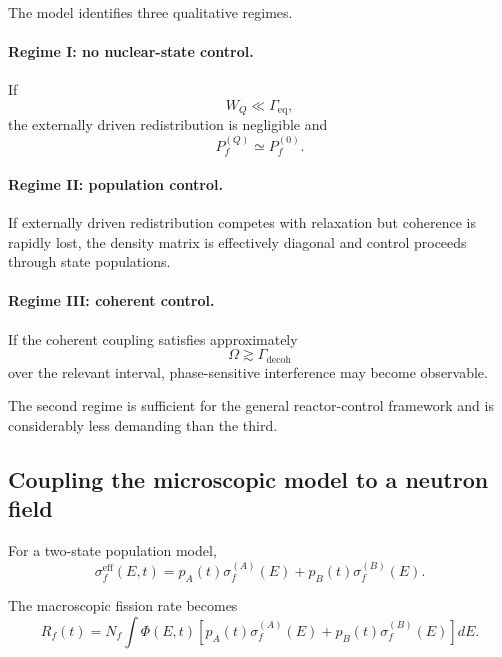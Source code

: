 The model identifies three qualitative regimes.

\paragraph{Regime I: no nuclear-state control.}
If
\begin{equation}
W_Q\ll\Gamma_{\mathrm{eq}},
\end{equation}
the externally driven redistribution is negligible and
\begin{equation}
P_f^{(Q)}\simeq P_f^{(0)}.
\end{equation}

\paragraph{Regime II: population control.}
If externally driven redistribution competes with relaxation but coherence is rapidly lost, the density matrix is effectively diagonal and control proceeds through state populations.

\paragraph{Regime III: coherent control.}
If the coherent coupling satisfies approximately
\begin{equation}
\Omega\gtrsim\Gamma_{\mathrm{decoh}}
\end{equation}
over the relevant interval, phase-sensitive interference may become observable.

The second regime is sufficient for the general reactor-control framework and is considerably less demanding than the third.

\subsection{Coupling the microscopic model to a neutron field}

For a two-state population model,
\begin{equation}
\sigma_f^{\mathrm{eff}}(E,t)
=
p_A(t)\sigma_f^{(A)}(E)
+
p_B(t)\sigma_f^{(B)}(E).
\end{equation}

The macroscopic fission rate becomes
\begin{equation}
R_f(t)
=
N_f
\int
\Phi(E,t)
\left[
p_A(t)\sigma_f^{(A)}(E)
+
p_B(t)\sigma_f^{(B)}(E)
\right]
dE.
\label{eq:macro_two_state}
\end{equation}

